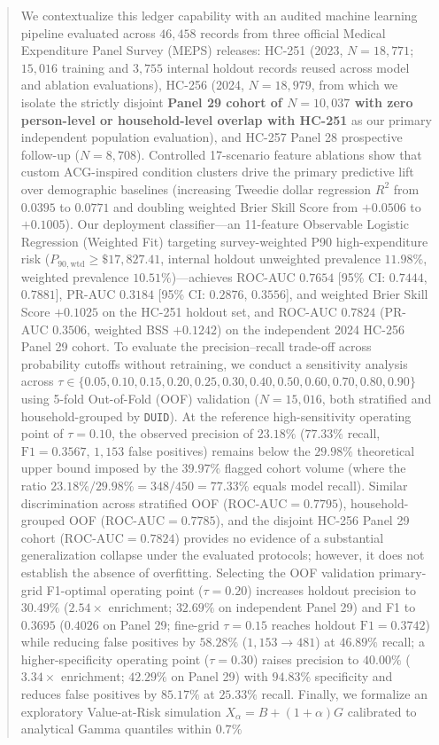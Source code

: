 \documentclass[runningheads]{llncs}
\begin{document}
\begin{abstract}
We contextualize this ledger capability with an audited machine learning pipeline evaluated across $46,458$ records from three official Medical Expenditure Panel Survey (MEPS) releases: HC-251 (2023, $N=18,771$; $15,016$ training and $3,755$ internal holdout records reused across model and ablation evaluations), HC-256 (2024, $N=18,979$, from which we isolate the strictly disjoint \textbf{Panel 29 cohort of $N=10,037$ with zero person-level or household-level overlap with HC-251} as our primary independent population evaluation), and HC-257 Panel 28 prospective follow-up ($N=8,708$). Controlled 17-scenario feature ablations show that custom ACG-inspired condition clusters drive the primary predictive lift over demographic baselines (increasing Tweedie dollar regression $R^2$ from $0.0395$ to $0.0771$ and doubling weighted Brier Skill Score from $+0.0506$ to $+0.1005$). Our deployment classifier---an 11-feature Observable Logistic Regression (Weighted Fit) targeting survey-weighted P90 high-expenditure risk ($P_{90,\text{wtd}} \ge \$17,827.41$, internal holdout unweighted prevalence $11.98\%$, weighted prevalence $10.51\%$)---achieves ROC-AUC $0.7654$ [95\% CI: $0.7444$, $0.7881$], PR-AUC $0.3184$ [95\% CI: $0.2876$, $0.3556$], and weighted Brier Skill Score $+0.1025$ on the HC-251 holdout set, and ROC-AUC $0.7824$ (PR-AUC $0.3506$, weighted BSS $+0.1242$) on the independent 2024 HC-256 Panel 29 cohort. To evaluate the precision--recall trade-off across probability cutoffs without retraining, we conduct a sensitivity analysis across $\tau \in \{0.05,\allowbreak 0.10,\allowbreak 0.15,\allowbreak 0.20,\allowbreak 0.25,\allowbreak 0.30,\allowbreak 0.40,\allowbreak 0.50,\allowbreak 0.60,\allowbreak 0.70,\allowbreak 0.80,\allowbreak 0.90\}$ using 5-fold Out-of-Fold (OOF) validation ($N=15,016$, both stratified and household-grouped by \texttt{DUID}). At the reference high-sensitivity operating point of $\tau = 0.10$, the observed precision of $23.18\%$ ($77.33\%$ recall, $\text{F1} = 0.3567$, $1,153$ false positives) remains below the $29.98\%$ theoretical upper bound imposed by the $39.97\%$ flagged cohort volume (where the ratio $23.18\% / 29.98\% = 348 / 450 = 77.33\%$ equals model recall). Similar discrimination across stratified OOF ($\text{ROC-AUC} = 0.7795$), household-grouped OOF ($\text{ROC-AUC} = 0.7785$), and the disjoint HC-256 Panel 29 cohort ($\text{ROC-AUC} = 0.7824$) provides no evidence of a substantial generalization collapse under the evaluated protocols; however, it does not establish the absence of overfitting. Selecting the OOF validation primary-grid F1-optimal operating point ($\tau = 0.20$) increases holdout precision to $30.49\%$ ($2.54\times$ enrichment; $32.69\%$ on independent Panel 29) and F1 to $0.3695$ ($0.4026$ on Panel 29; fine-grid $\tau = 0.15$ reaches holdout $\text{F1} = 0.3742$) while reducing false positives by $58.28\%$ ($1,153 \to 481$) at $46.89\%$ recall; a higher-specificity operating point ($\tau = 0.30$) raises precision to $40.00\%$ ($3.34\times$ enrichment; $42.29\%$ on Panel 29) with $94.83\%$ specificity and reduces false positives by $85.17\%$ at $25.33\%$ recall. Finally, we formalize an exploratory Value-at-Risk simulation $X_\alpha = B + (1+\alpha)G$ calibrated to analytical Gamma quantiles within $0.7\%$ 
\end{abstract}
\end{document}
